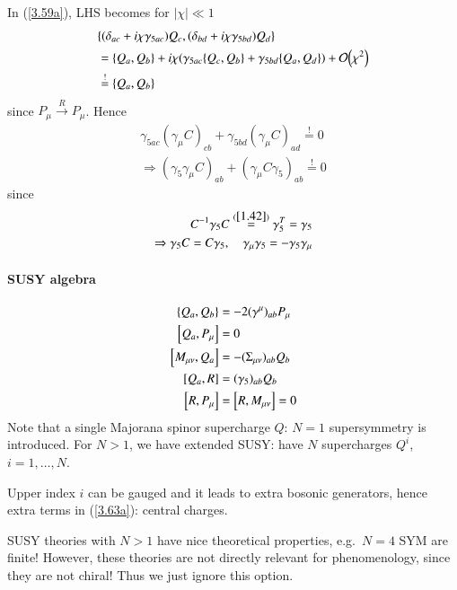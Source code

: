 In (\ref{3.59a}), LHS becomes for $|\chi| \ll 1$
\begin{align*}
   &\acomm{(\delta_{ac} + i \chi \gamma_{5 ac})Q_c}{(\delta_{bd} + i\chi \gamma_{5 bd})Q_d} \\
   &= \acomm{Q_a}{Q_b} + i \chi (\gamma_{5ac} \acomm{Q_c}{Q_b} + \gamma_{5bd} \acomm{Q_a}{Q_d}) + \order{\chi^2}  \\
   & \stackrel{!}{=} \acomm{Q_a}{Q_b}
\end{align*}
since $P_\mu \stackrel{R}{\rightarrow} P_\mu$. 
Hence
\begin{align*}
   \gamma_{5ac} (\gamma_\mu C)_{cb} + \gamma_{5 bd} (\gamma_\mu C)_{ad} \stackrel{!}{=} 0 \\
   \Rightarrow (\gamma_5 \gamma_\mu C)_{ab} + (\gamma_\mu C \gamma_5)_{ab} \stackrel{!}{=} 0
\end{align*}
since 
\begin{align*}
   C^{-1} \gamma_5 C \stackrel{(\ref{1.42})} = \gamma_5^T = \gamma_5 \\
   \Rightarrow \gamma_5 C = C \gamma_5, \quad \gamma_\mu \gamma_5 = - \gamma_5 \gamma_\mu
\end{align*}

\paragraph{SUSY algebra}
\begin{subequations}\label{3.63}
\begin{align}
   \acomm{Q_a}{Q_b} &= -2 (\gamma^\mu)_{ab} P_\mu \label{3.63a} \\
   \comm{Q_a}{P_\mu} &= 0 \label{3.63b}\\
   \comm{M_{\mu\nu}}{Q_a} &= -(\Sigma_{\mu\nu})_{ab} Q_b \label{3.63c} \\
   \comm{Q_a}{R} &= (\gamma_5)_{ab} Q_b \label{3.63d} \\
   \comm{R}{P_\mu} &= \comm{R}{M_{\mu\nu}} = 0 \label{3.63e}
\end{align}
\end{subequations}
Note that a single Majorana spinor supercharge $Q$: $N=1$ supersymmetry is introduced. For $N>1$, we have extended SUSY: have $N$ supercharges $Q^i$, $i=1,\dots, N$.

Upper index $i$ can be gauged and it leads to extra bosonic generators, hence extra terms in (\ref{3.63a}): central charges.

SUSY theories with $N>1$ have nice theoretical properties, e.g.~$N=4$ SYM are finite! However, these theories are not directly relevant for phenomenology, since they are not chiral! Thus we just ignore this option.

